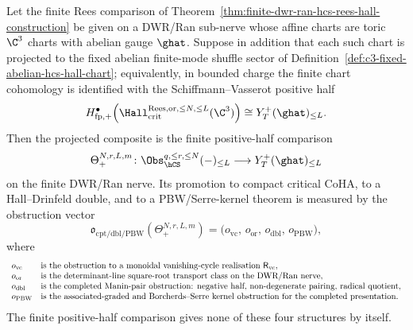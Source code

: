 \begin{theorem}
\label{thm:finite-positive-half-obstruction-map}
Let the finite Rees comparison of
Theorem~\ref{thm:finite-dwr-ran-hcs-rees-hall-construction} be given on
a DWR/Ran sub-nerve whose affine charts are toric $\C^3$ charts with
abelian gauge $\ghat$. Suppose in addition that each such chart is
projected to the fixed abelian finite-mode shuffle sector of
Definition~\ref{def:c3-fixed-abelian-hcs-hall-chart}; equivalently, in
bounded charge the finite chart cohomology is identified with the
Schiffmann--Vasserot positive half
\[
 H^\bullet_{\mathrm{fp},+}\!\left(
 \Hall_{\mathrm{crit}}^{\mathrm{Rees},\mathrm{or},\leq N,\leq L}(\C^3)
 \right)
 \cong
 Y_T^+(\ghat)_{\leq L}.
\]
Then the projected composite is the finite positive-half comparison
\[
 \Theta_{+}^{N,r,L,m}\colon
 \Obs_{\hCS}^{q,\leq r,\leq N}(-)_{\leq L}
 \longrightarrow
 Y_T^+(\ghat)_{\leq L}
\]
on the finite DWR/Ran nerve. Its promotion to compact critical CoHA,
to a Hall--Drinfeld double, and to a PBW/Serre-kernel theorem is
measured by the obstruction vector
\[
 \mathfrak o_{\mathrm{cpt/dbl/PBW}}(\Theta_{+}^{N,r,L,m})
 =
 \bigl(
 o_{\mathrm{vc}},\,
 o_{\mathrm{or}},\,
 o_{\mathrm{dbl}},\,
 o_{\mathrm{PBW}}
 \bigr),
\]
where
\[
\begin{array}{ll}
o_{\mathrm{vc}} &
\textup{is the obstruction to a monoidal vanishing-cycle realisation }
\mathsf R_{\mathrm{vc}},\\
o_{\mathrm{or}} &
\textup{is the determinant-line square-root transport class on the
DWR/Ran nerve},\\
o_{\mathrm{dbl}} &
\textup{is the completed Manin-pair obstruction: negative half,
non-degenerate pairing, radical quotient},\\
o_{\mathrm{PBW}} &
\textup{is the associated-graded and Borcherds--Serre kernel
obstruction for the completed presentation}.
\end{array}
\]
The finite positive-half comparison gives none of these four structures
by itself.
\end{theorem}

